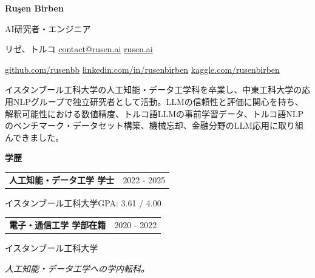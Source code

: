 \documentclass[11pt,a4paper]{article}
\makeatletter
\newcommand{\cvlink}[2]{\href{#1}{\textcolor{linkblue}{#2}}}
\newcommand{\cvsep}{\enspace\textperiodcentered\enspace{}}
\newcommand{\cvsection}[3][5]{%
  \par\Needspace*{#1\baselineskip}\vspace{6pt}%
  {\bfseries\fontsize{11}{13}\selectfont #3}\par\nobreak
  \vspace{3pt}{\color{muted}\hrule height 0.4pt}\nobreak\vspace{6pt}%
}
\newcommand{\cvheading}[2]{%
  \begin{tabularx}{\linewidth}{@{}>{\raggedright\arraybackslash}X@{\hspace{10pt}}r@{}}%
  \textbf{#1} & {\small\color{muted}#2}\\
  \end{tabularx}\par\nobreak
}
\newcommand{\dates}[1]{\hfill{\small\color{muted}#1}}
\newcommand{\cvbody}[1]{{\small\raggedright #1\par}}
\makeatother
\begin{document}
\thispagestyle{firstpage}

{\fontsize{24}{28}\selectfont{}\bfseries{} Ruşen Birben}\par\vspace{3pt}
{\fontsize{11}{13}\selectfont{}AI研究者・エンジニア}\par\vspace{6pt}
{\small{}
リゼ、トルコ\cvsep
\cvlink{mailto:contact@rusen.ai}{contact@rusen.ai}\cvsep
\cvlink{https://rusen.ai}{rusen.ai}\par\vspace{4pt}
\cvlink{https://github.com/rusenbb}{github.com/rusenbb}\cvsep
\cvlink{https://linkedin.com/in/rusenbirben}{linkedin.com/in/rusenbirben}\cvsep
\cvlink{https://www.kaggle.com/rusenbirben}{kaggle.com/rusenbirben}
}\par\vspace{6pt}
\cvbody{イスタンブール工科大学の人工知能・データ工学科を卒業し、中東工科大学の応用NLPグループで独立研究者として活動。LLMの信頼性と評価に関心を持ち、解釈可能性における数値精度、トルコ語LLMの事前学習データ、トルコ語NLPのベンチマーク・データセット構築、機械忘却、金融分野のLLM応用に取り組んできました。}

\cvsection{}{学歴}
\begin{minipage}{\linewidth}\raggedright
\cvheading{人工知能・データ工学 学士}{2022 - 2025}
{\small{}イスタンブール工科大学}\dates{GPA: 3.61 / 4.00}\par
\end{minipage}\par\vspace{5pt}
\begin{minipage}{\linewidth}\raggedright
\cvheading{電子・通信工学 学部在籍}{2020 - 2022}
{\small{}イスタンブール工科大学}\par
{\small{}\itshape{}\color{muted}人工知能・データ工学への学内転科。}\par\end{minipage}\par\vspace{5pt}
\end{document}
